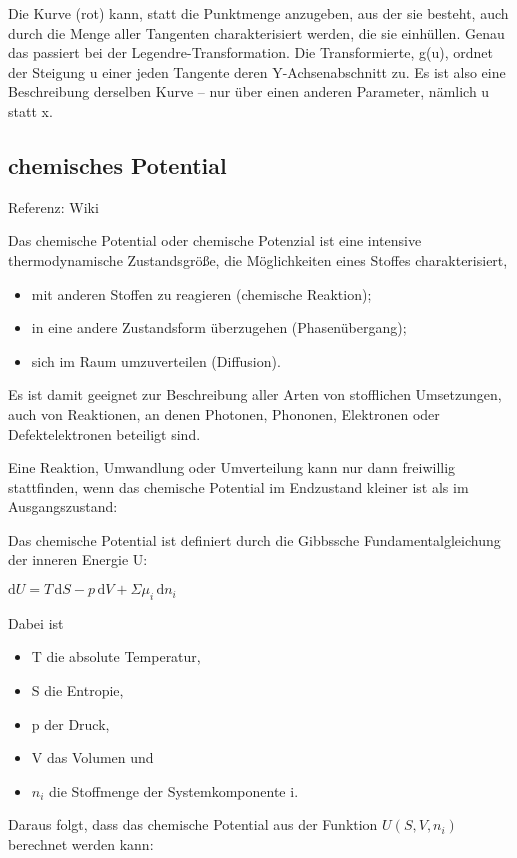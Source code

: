 \documentclass[]{article}
\begin{document}
 Die Kurve (rot) kann, statt die Punktmenge anzugeben, aus der sie besteht, auch durch die Menge aller Tangenten charakterisiert werden, die sie einhüllen. Genau das passiert bei der Legendre-Transformation. Die Transformierte, g(u), ordnet der Steigung u einer jeden Tangente deren Y-Achsenabschnitt zu. Es ist also eine Beschreibung derselben Kurve – nur über einen anderen Parameter, nämlich u statt x.


\subsection{chemisches Potential}
Referenz: Wiki

Das chemische Potential oder chemische Potenzial \mu ist eine intensive thermodynamische Zustandsgröße, die Möglichkeiten eines Stoffes charakterisiert,
\begin{itemize}
 \item mit anderen Stoffen zu reagieren (chemische Reaktion);
 \item in eine andere Zustandsform überzugehen (Phasenübergang);
 \item sich im Raum umzuverteilen (Diffusion).
\end{itemize}

Es ist damit geeignet zur Beschreibung aller Arten von stofflichen Umsetzungen, auch von Reaktionen, an denen Photonen, Phononen, Elektronen oder Defektelektronen beteiligt sind.

Eine Reaktion, Umwandlung oder Umverteilung kann nur dann freiwillig stattfinden, wenn das chemische Potential im Endzustand kleiner ist als im Ausgangszustand:

Das chemische Potential ist definiert durch die Gibbssche Fundamentalgleichung der inneren Energie U:

   $ \mathrm{d}U = T\, \mathrm{d}S - p\, \mathrm {d}V + \Sigma\mu_i\, \mathrm{d}n_i \!\quad$

Dabei ist
\begin{itemize}
   \item T die absolute Temperatur,
   \item S die Entropie,
   \item p der Druck,
   \item V das Volumen und
   \item $n_i$ die Stoffmenge der Systemkomponente i.
\end{itemize}
Daraus folgt, dass das chemische Potential aus der Funktion $U(S, V, n_i)$ berechnet werden kann:
\end{document}
